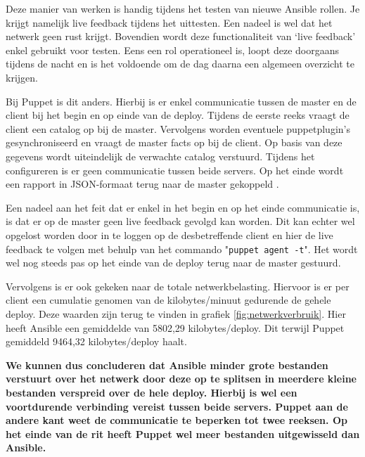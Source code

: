 Deze manier van werken is handig tijdens het testen van nieuwe Ansible rollen. Je krijgt namelijk live feedback tijdens het uittesten. Een nadeel is wel dat het netwerk geen rust krijgt. Bovendien wordt deze functionaliteit van ‘live feedback' enkel gebruikt voor testen. Eens een rol operationeel is, loopt deze doorgaans tijdens de nacht en is het voldoende om de dag daarna een algemeen overzicht te krijgen. 

Bij Puppet is dit anders. Hierbij is er enkel communicatie tussen de master en de client bij het begin en op einde van de \gls{deploy}.  Tijdens de eerste reeks vraagt de client een \gls{catalog} op bij de master. Vervolgens worden eventuele \gls{puppetplugin}'s gesynchroniseerd en vraagt de master \gls{fact}s op bij de client. Op basis van deze gegevens wordt uiteindelijk de verwachte \gls{catalog} verstuurd. Tijdens het configureren is er geen communicatie tussen beide servers. Op het einde wordt een rapport in JSON-formaat terug naar de master gekoppeld \autocite{neworkusage}.
 
Een nadeel aan het feit dat er enkel in het begin en op het einde communicatie is, is dat er op de master geen live feedback gevolgd kan worden. Dit kan echter wel opgelost worden door in te loggen op de desbetreffende client en hier de live feedback te volgen met behulp van het commando "\texttt{puppet agent -t}". Het wordt wel nog steeds pas op het einde van de \gls{deploy} terug naar de master gestuurd.

Vervolgens is er ook gekeken naar de totale netwerkbelasting. Hiervoor is er per client een cumulatie genomen van de kilobytes/minuut gedurende de gehele \gls{deploy}. Deze waarden zijn terug te vinden in grafiek \ref{fig:netwerkverbruik}. Hier heeft Ansible een gemiddelde van 5802,29 kilobytes/deploy. Dit terwijl Puppet gemiddeld 9464,32 kilobytes/deploy haalt. 

\textbf{We kunnen dus concluderen dat Ansible minder grote bestanden verstuurt over het netwerk door deze op te splitsen in meerdere kleine bestanden verspreid over de hele \gls{deploy}. Hierbij is wel een voortdurende verbinding vereist tussen beide servers.  Puppet aan de andere kant weet de communicatie te beperken tot twee reeksen. Op het einde van de rit heeft Puppet wel meer bestanden uitgewisseld dan Ansible. }

